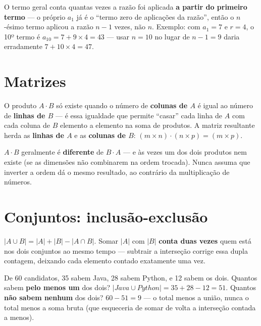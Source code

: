 \begin{cuidado}
O termo geral conta quantas vezes a razão foi aplicada \textbf{a partir do
primeiro termo} --- o próprio $a_1$ já é o “termo zero de aplicações da
razão”, então o $n$-ésimo termo aplicou a razão $n-1$ vezes, não $n$.
Exemplo: com $a_1=7$ e $r=4$, o 10º termo é $a_{10} = 7 + 9 \times 4 = 43$
--- usar $n=10$ no lugar de $n-1=9$ daria erradamente $7+10\times4=47$.
\end{cuidado}

\section{Matrizes}

\begin{conceito}
O produto $A \cdot B$ só existe quando o número de \textbf{colunas de $A$}
é igual ao número de \textbf{linhas de $B$} --- é essa igualdade que
permite “casar” cada linha de $A$ com cada coluna de $B$ elemento a
elemento na soma de produtos. A matriz resultante herda as
\textbf{linhas de $A$} e as \textbf{colunas de $B$}:
$(m \times n) \cdot (n \times p) = (m \times p)$.
\end{conceito}

\begin{cuidado}
$A \cdot B$ geralmente é \textbf{diferente} de $B \cdot A$ --- e às vezes
um dos dois produtos nem existe (se as dimensões não combinarem na ordem
trocada). Nunca assuma que inverter a ordem dá o mesmo resultado, ao
contrário da multiplicação de números.
\end{cuidado}

\section{Conjuntos: inclusão-exclusão}

\begin{conceito}
$|A \cup B| = |A| + |B| - |A \cap B|$. Somar $|A|$ com $|B|$
\textbf{conta duas vezes} quem está nos dois conjuntos ao mesmo tempo ---
subtrair a interseção corrige essa dupla contagem, deixando cada elemento
contado exatamente uma vez.
\end{conceito}

\begin{exemplo}
De 60 candidatos, 35 sabem Java, 28 sabem Python, e 12 sabem os dois.
Quantos sabem \textbf{pelo menos um} dos dois? $|Java \cup Python| = 35 +
28 - 12 = 51$. Quantos \textbf{não sabem nenhum} dos dois? $60 - 51 = 9$
--- o total menos a união, nunca o total menos a soma bruta (que
esqueceria de somar de volta a interseção contada a menos).
\end{exemplo}

